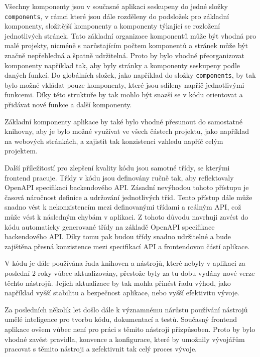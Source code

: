 Všechny komponenty jsou v současné aplikaci seskupeny do jedné složky \texttt{components}, v rámci které jsou dále rozděleny do podsložek pro základní komponenty, složitější komponenty a komponenty týkající se rozložení jednotlivých stránek. Tato základní organizace komponentů může být vhodná pro malé projekty, nicméně s narůstajícím počtem komponentů a stránek může být značně nepřehledná a špatně udržitelná. Proto by bylo vhodné přeorganizovat komponenty například tak, aby byly stránky a komponenty seskupeny podle daných funkcí. Do globálních složek, jako například do složky \texttt{components}, by tak bylo možné vkládat pouze komponenty, které jsou sdíleny napříč jednotlivými funkcemi. Díky této struktuře by tak mohlo být snazší se v kódu orientovat a přidávat nové funkce a další komponenty.

Základní komponenty aplikace by také bylo vhodné přesunout do samostatné knihovny, aby je bylo možné využívat ve všech částech projektu, jako například na webových stránkách, a zajistit tak konzistenci vzhledu napříč celým projektem.

Další příležitostí pro zlepšení kvality kódu jsou samotné třídy, se kterými frontend pracuje. Třídy v kódu jsou definovány ručně tak, aby reflektovaly OpenAPI specifikaci backendového API. Zásadní nevýhodou tohoto přístupu je časová náročnost definice a udržování jednotlivých tříd. Tento přístup dále může snadno vést k nekonzistencím mezi definovanými třídami a reálným API, což může vést k následným chybám v aplikaci. Z tohoto důvodu navrhuji zavést do kódu automaticky generované třídy na základě OpenAPI specifikace backendového API. Díky tomu pak budou třídy snadno udržitelné a bude zajištěna přesná konzistence mezi specifikací API a frontendovou částí aplikace.

V kódu je dále používána řada knihoven a nástrojů, které nebyly v aplikaci za poslední 2 roky vůbec aktualizovány, přestože byly za tu dobu vydány nové verze těchto nástrojů. Jejich aktualizace by tak mohla přinést řadu výhod, jako například vyšší stabilitu a bezpečnost aplikace, nebo vyšší efektivitu vývoje. 

Za posledních několik let došlo dále k významnému nárůstu používání nástrojů umělé inteligence pro tvorbu kódu, dokumentací a testů. Současný frontend aplikace ovšem vůbec není pro práci s těmito nástroji přizpůsoben. Proto by bylo vhodné zavést pravidla, konvence a konfigurace, které by umožnily vývojářům pracovat s těmito nástroji a zefektivnit tak celý proces vývoje.

